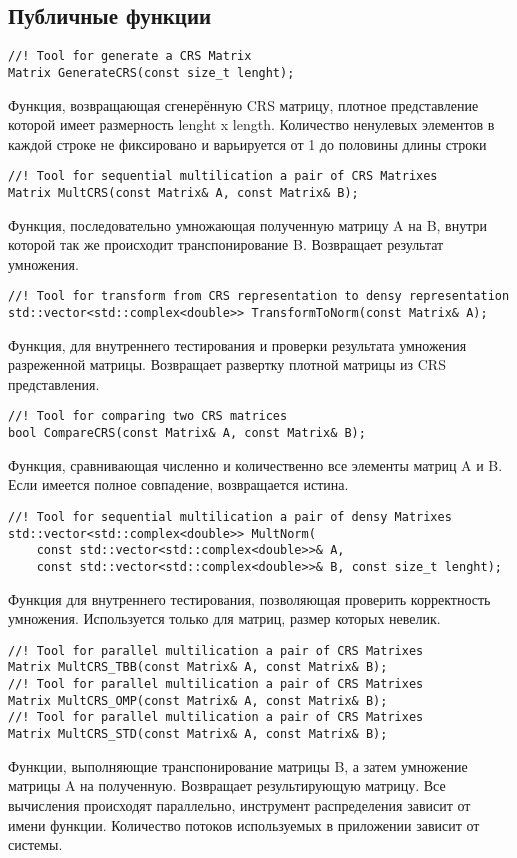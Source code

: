 \documentclass{report}
\begin{document}
\subsection*{Публичные функции}
\begin{lstlisting}
//! Tool for generate a CRS Matrix
Matrix GenerateCRS(const size_t lenght);
\end{lstlisting}
\par Функция, возвращающая сгенерённую CRS матрицу, плотное представление которой имеет размерность lenght x length. Количество ненулевых элементов в каждой строке не фиксировано и варьируется от 1 до половины длины строки
\begin{lstlisting}
//! Tool for sequential multilication a pair of CRS Matrixes
Matrix MultCRS(const Matrix& A, const Matrix& B);
\end{lstlisting}
\par Функция, последовательно умножающая полученную матрицу A на B, внутри которой так же происходит транспонирование B. Возвращает результат умножения.
\begin{lstlisting}
//! Tool for transform from CRS representation to densy representation
std::vector<std::complex<double>> TransformToNorm(const Matrix& A);
\end{lstlisting}
\par Функция, для внутреннего тестирования и проверки результата умножения разреженной матрицы. Возвращает развертку плотной матрицы из CRS представления.
\begin{lstlisting}
//! Tool for comparing two CRS matrices
bool CompareCRS(const Matrix& A, const Matrix& B);
\end{lstlisting}
\par Функция, сравнивающая численно и количественно все элементы матриц A и B. Если имеется полное совпадение, возвращается истина.
\begin{lstlisting}
//! Tool for sequential multilication a pair of densy Matrixes
std::vector<std::complex<double>> MultNorm(
    const std::vector<std::complex<double>>& A,
    const std::vector<std::complex<double>>& B, const size_t lenght);
\end{lstlisting}
\par Функция для внутреннего тестирования, позволяющая проверить корректность умножения. Используется только для матриц, размер которых невелик.
\begin{lstlisting}
//! Tool for parallel multilication a pair of CRS Matrixes
Matrix MultCRS_TBB(const Matrix& A, const Matrix& B);
//! Tool for parallel multilication a pair of CRS Matrixes
Matrix MultCRS_OMP(const Matrix& A, const Matrix& B);
//! Tool for parallel multilication a pair of CRS Matrixes
Matrix MultCRS_STD(const Matrix& A, const Matrix& B);
\end{lstlisting}
\par Функции, выполняющие транспонирование матрицы B, а затем умножение матрицы A на полученную. Возвращает результирующую матрицу. Все вычисления происходят параллельно, инструмент распределения зависит от имени функции. Количество потоков используемых в приложении зависит от системы.
\newpage
\end{document}

